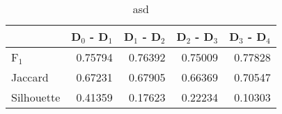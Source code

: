 \begin{table}
\centering
\caption{asd}
\label{tab:s1-orig-pivotbi-combined}
\begin{tabular}{lrrrr}
\toprule
{} &  D$_0$ - D$_1$ &  D$_1$ - D$_2$ &  D$_2$ - D$_3$ &  D$_3$ - D$_4$ \\
\midrule
F$_1$      &        0.75794 &        0.76392 &        0.75009 &        0.77828 \\
Jaccard    &        0.67231 &        0.67905 &        0.66369 &        0.70547 \\
Silhouette &        0.41359 &        0.17623 &        0.22234 &        0.10303 \\
\bottomrule
\end{tabular}
\end{table}
